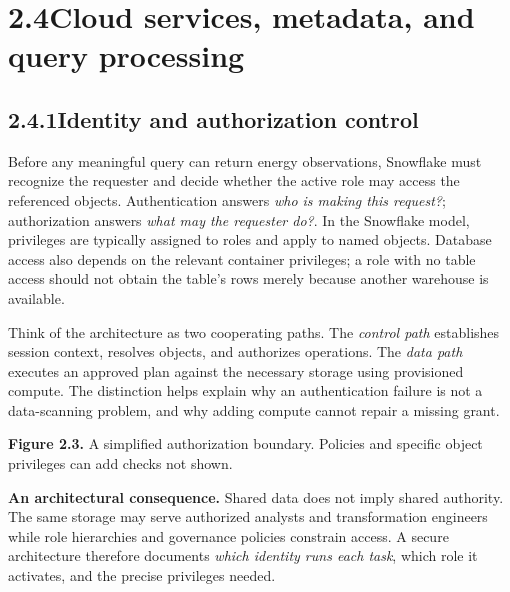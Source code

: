 \documentclass[11pt,twoside]{article}
\newcommand{\topic}[2]{\subsection*{#1\quad #2}}
\begin{document}
\newpage
\section*{2.4\quad Cloud services, metadata, and query processing}
\topic{2.4.1}{Identity and authorization control}
Before any meaningful query can return energy observations, Snowflake must recognize the requester and decide whether the active role may access the referenced objects. Authentication answers \emph{who is making this request?}; authorization answers \emph{what may the requester do?}. In the Snowflake model, privileges are typically assigned to roles and apply to named objects. Database access also depends on the relevant container privileges; a role with no table access should not obtain the table's rows merely because another warehouse is available.

Think of the architecture as two cooperating paths. The \emph{control path} establishes session context, resolves objects, and authorizes operations. The \emph{data path} executes an approved plan against the necessary storage using provisioned compute. The distinction helps explain why an authentication failure is not a data-scanning problem, and why adding compute cannot repair a missing grant.

\begin{center}
\end{center}
{\small\color{inkgray}\textbf{Figure 2.3.} A simplified authorization boundary. Policies and specific object privileges can add checks not shown.}\par

\textbf{An architectural consequence.} Shared data does not imply shared authority. The same storage may serve authorized analysts and transformation engineers while role hierarchies and governance policies constrain access. A secure architecture therefore documents \emph{which identity runs each task}, which role it activates, and the precise privileges needed.
\end{document}
